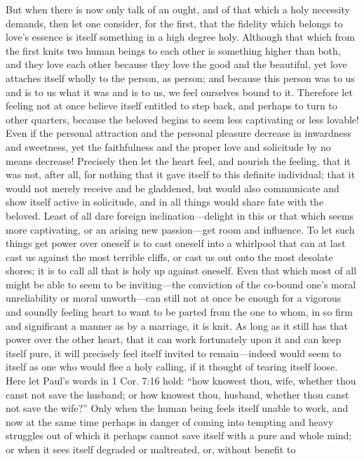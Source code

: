 \documentclass[12pt,a4paper]{book}
\begin{document}
But when there is now only talk of an ought, and of that which a holy
necessity demands, then let one consider, for the first, that the fidelity
which belongs to love's essence is itself something in a high degree holy.
Although that which from the first knits two human beings to each other is
something higher than both, and they love each other because they love the
good and the beautiful, yet love attaches itself wholly to the person, as
person; and because this person was to us and is to us what it was and is
to us, we feel ourselves bound to it. Therefore let feeling not at once
believe itself entitled to step back, and perhaps to turn to other
quarters, because the beloved begins to seem less captivating or less
lovable! Even if the personal attraction and the personal pleasure decrease
in inwardness and sweetness, yet the faithfulness and the proper love and
solicitude by no means decrease! Precisely then let the heart feel, and
nourish the feeling, that it was not, after all, for nothing that it gave
itself to this definite individual; that it would not merely receive and be
gladdened, but would also communicate and show itself active in solicitude,
and in all things would share fate with the beloved. Least of all dare
foreign inclination---delight in this or that which seems more captivating,
or an arising new passion---get room and influence. To let such things get
power over oneself is to cast oneself into a whirlpool that can at last cast
us against the most terrible cliffs, or cast us out onto the most desolate
shores; it is to call all that is holy up against oneself. Even that which
most of all might be able to seem to be inviting---the conviction of the
co-bound one's moral unreliability or moral unworth---can still not at once
be enough for a vigorous and soundly feeling heart to want to be parted
from the one to whom, in so firm and significant a manner as by a marriage,
it is knit. As long as it still has that power over the other heart, that it
can work fortunately upon it and can keep itself pure, it will precisely
feel itself invited to remain---indeed would seem to itself as one who would
flee a holy calling, if it thought of tearing itself loose. Here let Paul's
words in 1 Cor. 7:16 hold: ``how knowest thou, wife, whether thou canst not
save the husband; or how knowest thou, husband, whether thou canst not save
the wife?'' Only when the human being feels itself unable to work, and now
at the same time perhaps in danger of coming into tempting and heavy
struggles out of which it perhaps cannot save itself with a pure and whole
mind; or when it sees itself degraded or maltreated, or, without benefit to
\end{document}
